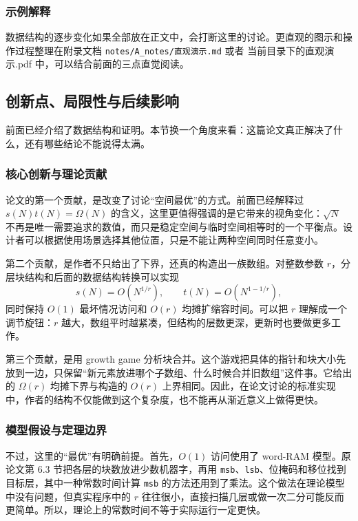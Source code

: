 \documentclass[12pt,a4paper]{article}
\begin{document}
\subsubsection{示例解释}

数据结构的逐步变化如果全部放在正文中，会打断这里的讨论。更直观的图示和操作过程整理在附录文档 \texttt{notes/A\_notes/直观演示.md} 或者 当前目录下的直观演示.pdf 中，可以结合前面的三点直觉阅读。


\FloatBarrier
\subsection{创新点、局限性与后续影响}

前面已经介绍了数据结构和证明。本节换一个角度来看：这篇论文真正解决了什么，还有哪些结论不能说得太满\cite{tarjan2023optimalresizablearrays}。

\subsubsection{核心创新与理论贡献}

论文的第一个贡献，是改变了讨论“空间最优”的方式。前面已经解释过 $s(N)t(N)=\Omega(N)$ 的含义，这里更值得强调的是它带来的视角变化：$\sqrt{N}$ 不再是唯一需要追求的数值，而只是稳定空间与临时空间相等时的一个平衡点。设计者可以根据使用场景选择其他位置，只是不能让两种空间同时任意变小\cite{tarjan2023optimalresizablearrays}。

第二个贡献，是作者不只给出了下界，还真的构造出一族数组。对整数参数 $r$，分层块结构和后面的数据结构转换可以实现
\[
    s(N)=O(N^{1/r}),
    \qquad
    t(N)=O(N^{1-1/r}),
\]
同时保持 $O(1)$ 最坏情况访问和 $O(r)$ 均摊扩缩容时间。可以把 $r$ 理解成一个调节旋钮：$r$ 越大，数组平时越紧凑，但结构的层数更深，更新时也要做更多工作。

第三个贡献，是用 growth game 分析块合并。这个游戏把具体的指针和块大小先放到一边，只保留“新元素放进哪个子数组、什么时候合并旧数组”这件事。它给出的 $\Omega(r)$ 均摊下界与构造的 $O(r)$ 上界相同。因此，在论文讨论的标准实现中，作者的结构不仅能做到这个复杂度，也不能再从渐近意义上做得更快。

\subsubsection{模型假设与定理边界}

不过，这里的“最优”有明确前提。首先，$O(1)$ 访问使用了 word-RAM 模型。原论文第 6.3 节把各层的块数放进少数机器字，再用 \texttt{msb}、\texttt{lsb}、位掩码和移位找到目标层，其中一种常数时间计算 \texttt{msb} 的方法还用到了乘法。这个做法在理论模型中没有问题，但真实程序中的 $r$ 往往很小，直接扫描几层或做一次二分可能反而更简单\cite{tarjan2023optimalresizablearrays}。所以，理论上的常数时间不等于实际运行一定更快。
\end{document}
